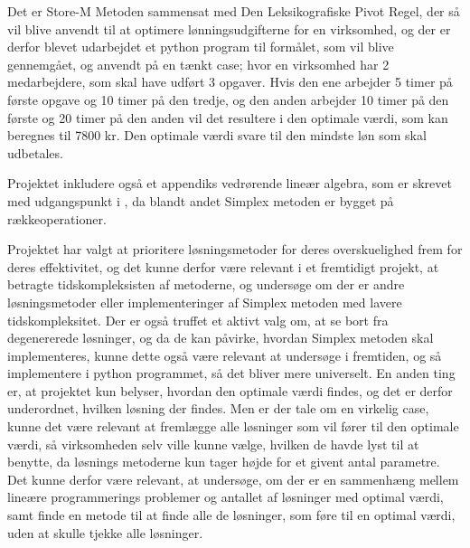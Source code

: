 Det er Store-M Metoden sammensat med Den Leksikografiske Pivot Regel, der så vil blive anvendt til at optimere lønningsudgifterne for en virksomhed, og der er derfor blevet udarbejdet et python program til formålet, som vil blive gennemgået, og anvendt på en tænkt case; hvor en virksomhed har 2 medarbejdere, som skal have udført 3 opgaver. 
Hvis den ene arbejder 5 timer på første opgave og 10 timer på den tredje, og den anden arbejder 10 timer på den første og 20 timer på den anden vil det resultere i den optimale værdi, som kan beregnes til 7800 kr. Den optimale værdi svare til den mindste løn som skal udbetales.

Projektet inkludere også et appendiks vedrørende lineær algebra, som er skrevet med udgangspunkt i \citep{lial}, da blandt andet Simplex metoden er bygget på rækkeoperationer. 


Projektet har valgt at prioritere løsningsmetoder for deres overskuelighed frem for deres effektivitet, og det kunne derfor være relevant i et fremtidigt projekt, at betragte tidskompleksisten af metoderne, og undersøge om der er andre løsningsmetoder eller implementeringer af Simplex metoden med lavere tidskompleksitet.
Der er også truffet et aktivt valg om, at se bort fra degenererede løsninger, og da de kan påvirke, hvordan Simplex metoden skal implementeres, kunne dette også være relevant at undersøge i fremtiden, og så implementere i python programmet, så det bliver mere universelt.
En anden ting er, at projektet kun belyser, hvordan den optimale værdi findes, og det er derfor underordnet, hvilken løsning der findes. 
Men er der tale om en virkelig case, kunne det være relevant at fremlægge alle løsninger som vil fører til den optimale værdi, så virksomheden selv ville kunne vælge, hvilken de havde lyst til at benytte, da løsnings metoderne kun tager højde for et givent antal parametre.
Det kunne derfor være relevant, at undersøge, om der er en sammenhæng mellem lineære programmerings problemer og antallet af løsninger med optimal værdi, samt finde en metode til at finde alle de løsninger, som føre til en optimal værdi, uden at skulle tjekke alle løsninger.